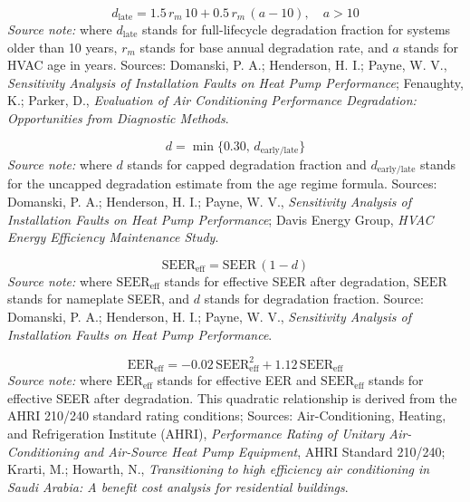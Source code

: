 \documentclass[12pt]{article}
\begin{document}
\begin{equation}
\label{eq:hvac_degradation_late}
d_{\mathrm{late}} = 1.5\,r_m\,10 + 0.5\,r_m\,(a-10),\quad a>10
\end{equation}
\noindent\textit{Source note:} where $d_{\mathrm{late}}$ stands for full-lifecycle degradation fraction for systems older than 10 years, $r_m$ stands for base annual degradation rate, and $a$ stands for HVAC age in years. Sources: Domanski, P. A.; Henderson, H. I.; Payne, W. V., \emph{Sensitivity Analysis of Installation Faults on Heat Pump Performance}; Fenaughty, K.; Parker, D., \emph{Evaluation of Air Conditioning Performance Degradation: Opportunities from Diagnostic Methods}.

\begin{equation}
\label{eq:hvac_degradation_cap}
d = \min\{0.30,\,d_{\mathrm{early/late}}\}
\end{equation}
\noindent\textit{Source note:} where $d$ stands for capped degradation fraction and $d_{\mathrm{early/late}}$ stands for the uncapped degradation estimate from the age regime formula. Sources: Domanski, P. A.; Henderson, H. I.; Payne, W. V., \emph{Sensitivity Analysis of Installation Faults on Heat Pump Performance}; Davis Energy Group, \emph{HVAC Energy Efficiency Maintenance Study}.

\begin{equation}
\label{eq:hvac_effective_seer}
\mathrm{SEER}_{\mathrm{eff}} = \mathrm{SEER}\,(1-d)
\end{equation}
\noindent\textit{Source note:} where $\mathrm{SEER}_{\mathrm{eff}}$ stands for effective SEER after degradation, $\mathrm{SEER}$ stands for nameplate SEER, and $d$ stands for degradation fraction. Source: Domanski, P. A.; Henderson, H. I.; Payne, W. V., \emph{Sensitivity Analysis of Installation Faults on Heat Pump Performance}.

\begin{equation}
\label{eq:hvac_eer_estimate}
\mathrm{EER}_{\mathrm{eff}} = -0.02\,\mathrm{SEER}_{\mathrm{eff}}^{2} + 1.12\,\mathrm{SEER}_{\mathrm{eff}}
\end{equation}
\noindent\textit{Source note:} where $\mathrm{EER}_{\mathrm{eff}}$ stands for effective EER and $\mathrm{SEER}_{\mathrm{eff}}$ stands for effective SEER after degradation. This quadratic relationship is derived from the AHRI 210/240 standard rating conditions; Sources: Air-Conditioning, Heating, and Refrigeration Institute (AHRI), \emph{Performance Rating of Unitary Air-Conditioning and Air-Source Heat Pump Equipment}, AHRI Standard 210/240; Krarti, M.; Howarth, N., \emph{Transitioning to high efficiency air conditioning in Saudi Arabia: A benefit cost analysis for residential buildings}.
\end{document}

